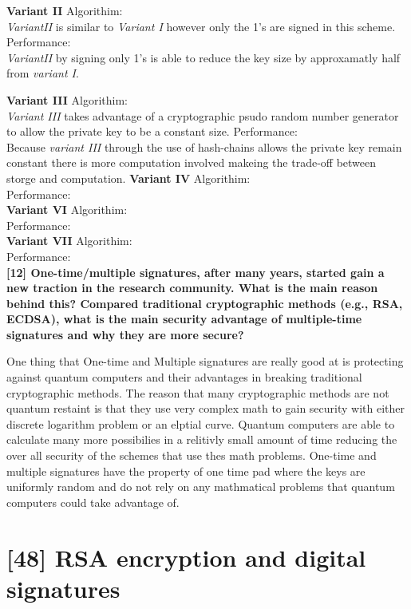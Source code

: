 \documentclass[letterpaper,11pt,notitlepage,fleqn]{article}
\begin{document}
\textbf{Variant II}
\noindent Algorithim:\\
\indent \textit{VariantII} is similar to \textit{Variant I} however only the 1's are signed in this scheme. 
\noindent Performance:\\
\indent \textit{VariantII} by signing only 1's is able to reduce the key size by approxamatly half from \textit{variant I}.

\textbf{Variant III}
\noindent Algorithim:\\
\indent \textit{Variant III} takes advantage of a cryptographic psudo random number generator to allow the private key to be a constant size. 
\noindent Performance:\\
\indent Because \textit{variant III} through the use of hash-chains allows the private key remain constant there is more computation involved makeing the trade-off between storge and computation. 
\textbf{Variant IV}
\noindent Algorithim:\\
\indent  
\noindent Performance:\\
\textbf{Variant VI}
\noindent Algorithim:\\
\indent
\noindent Performance:\\
\textbf{Variant VII}
\noindent Algorithim:\\
\noindent Performance:\\


\noindent \textbf{[12] One-time/multiple signatures, after many years, started gain a new traction in  the  research  community.  What  is  the  main  reason  behind  this?  Compared traditional cryptographic methods  (e.g., RSA, ECDSA), what  is  the main security advantage of multiple-time signatures and why they are more secure?}  

One thing that One-time and Multiple signatures are really good at is protecting against quantum computers and their advantages in breaking traditional cryptographic methods. The reason that many cryptographic methods are not quantum restaint is that they use very complex math to gain security with either discrete logarithm problem or an elptial curve. Quantum computers are able to calculate many more possibilies in a relitivly small amount of time reducing the over all
security of the schemes that use thes math problems. One-time and multiple signatures have the property of one time pad where the keys are uniformly random and do not rely on any mathmatical problems that quantum computers could take advantage of. 

\section{[48] RSA encryption and digital signatures}
\end{document}
